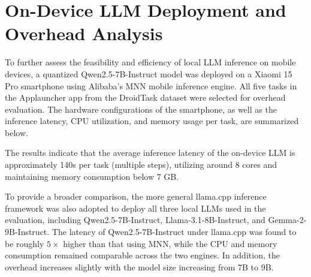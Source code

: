 \section{On-Device LLM Deployment and Overhead Analysis}

To further assess the feasibility and efficiency of local LLM inference on mobile devices, a quantized Qwen2.5-7B-Instruct model was deployed on a Xiaomi 15 Pro smartphone using Alibaba’s MNN \citep{lv2022walle} mobile inference engine. All five tasks in the Applauncher app from the DroidTask dataset were selected for overhead evaluation. The hardware configurations of the smartphone, as well as the inference latency, CPU utilization, and memory usage per task, are summarized below.  

\begin{table}[h!]
\caption{Hardware specifications of the mobile device.}
\centering
{}
\end{table}

\begin{table}[h!]
\caption{Performance of Qwen2.5-7B-Instruct deployed on Xiaomi 15 Pro (MNN).}
\centering
{}
\end{table}

The results indicate that the average inference latency of the on-device LLM is approximately 140s per task (multiple steps), utilizing around 8 cores and maintaining memory consumption below 7 GB.

To provide a broader comparison, the more general llama.cpp inference framework was also adopted to deploy all three local LLMs used in the evaluation, including Qwen2.5-7B-Instruct, Llama-3.1-8B-Instruct, and Gemma-2-9B-Instruct. The latency of Qwen2.5-7B-Instruct under llama.cpp was found to be roughly \(5\times\) higher than that using MNN, while the CPU and memory consumption remained comparable across the two engines. In addition, the overhead increases slightly with the model size increasing from 7B to 9B.

